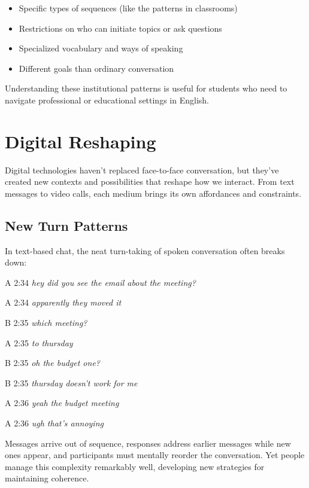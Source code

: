 \begin{itemize}[noitemsep]
\item Specific types of sequences (like the patterns in classrooms)
\item Restrictions on who can initiate topics or ask questions  
\item Specialized vocabulary and ways of speaking
\item Different goals than ordinary conversation
\end{itemize}
Understanding these institutional patterns is useful for students who need to navigate professional or educational settings in English.

\section{Digital Reshaping} \label{sec:digital}

Digital technologies haven't replaced face-to-face conversation, but they've created new contexts and possibilities that reshape how we interact. From text messages to video calls, each medium brings its own affordances and constraints.

\subsection{New Turn Patterns} \label{subsec:new-turns}

In text-based chat, the neat turn-taking of spoken conversation often breaks down:

\ea
\begin{dialogue}
\item[A 2:34] \textit{hey did you see the email about the meeting?}
\item[A 2:34] \textit{apparently they moved it}
\item[B 2:35] \textit{which meeting?}
\item[A 2:35] \textit{to thursday}
\item[B 2:35] \textit{oh the budget one?}
\item[B 2:35] \textit{thursday doesn't work for me}
\item[A 2:36] \textit{yeah the budget meeting}
\item[A 2:36] \textit{ugh that's annoying}
\end{dialogue}
\z
Messages arrive out of sequence, responses address earlier messages while new ones appear, and participants must mentally reorder the conversation. Yet people manage this complexity remarkably well, developing new strategies for maintaining coherence.

